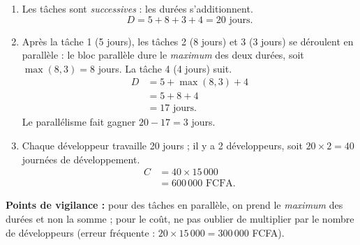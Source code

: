 \documentclass[11pt]{article}
\begin{document}
\begin{corrige}
\begin{enumerate}
  \item Les tâches sont \emph{successives} : les durées s'additionnent.
  \[ D = 5 + 8 + 3 + 4 = 20 \text{ jours.} \]
  \item Après la tâche 1 (5 jours), les tâches 2 (8 jours) et 3 (3 jours) se déroulent en parallèle : le bloc parallèle dure le \emph{maximum} des deux durées, soit $\max(8, 3) = 8$ jours. La tâche 4 (4 jours) suit.
  \begin{align*}
    D &= 5 + \max(8, 3) + 4 \\
      &= 5 + 8 + 4 \\
      &= 17 \text{ jours.}
  \end{align*}
  Le parallélisme fait gagner $20 - 17 = 3$ jours.
  \item Chaque développeur travaille 20 jours ; il y a 2 développeurs, soit $20 \times 2 = 40$ journées de développement.
  \begin{align*}
    C &= 40 \times 15\,000 \\
      &= 600\,000 \text{ FCFA.}
  \end{align*}
\end{enumerate}
\textbf{Points de vigilance :} pour des tâches en parallèle, on prend le \emph{maximum} des durées et non la somme ; pour le coût, ne pas oublier de multiplier par le nombre de développeurs (erreur fréquente : $20 \times 15\,000 = 300\,000$ FCFA).
\end{corrige}
\end{document}
